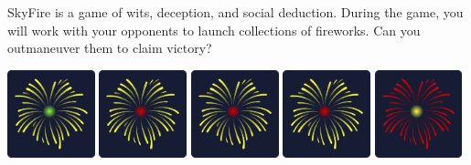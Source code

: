 \documentclass[a5paper, DIV=18, 12pt]{scrartcl}
\begin{document}
\vspace{-0.75ex}
\flushleft
SkyFire is a game of wits, deception, and social deduction. During the game, you will work with your opponents to launch collections of fireworks.  Can you outmaneuver them to claim victory? %

\vspace{2ex}

\includegraphics[width=0.19\textwidth]{Images/fireworks_card_front_display3.png} \hfill
\includegraphics[width=0.19\textwidth]{Images/fireworks_card_front_display.png} \hfill
\includegraphics[width=0.19\textwidth]{Images/fireworks_card_front_display.png} \hfill
\includegraphics[width=0.19\textwidth]{Images/fireworks_card_front_display.png} \hfill
\includegraphics[width=0.19\textwidth]{Images/fireworks_card_front_display2.png}

\vspace{-0.0ex}
\end{document}
